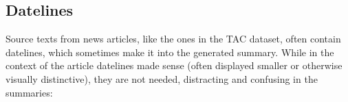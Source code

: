 \documentclass[a4paper,10pt]{scrartcl}
\theoremstyle{style}
\begin{document}














\subsection{Datelines}
Source texts from news articles, like the ones in the TAC dataset, often contain datelines, which sometimes make it into the generated summary. While in the context of the article datelines made sense (often displayed smaller or otherwise visually distinctive), they are not needed, distracting and confusing in the summaries:
\end{document}
